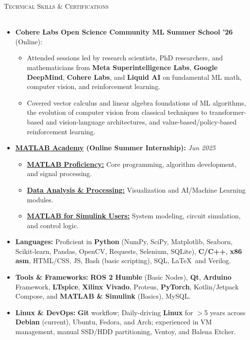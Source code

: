 \documentclass[a4paper]{article}
\newcommand{\lineunder} {
    \vspace*{-8pt} \\
    \hspace*{-18pt} \hrulefill \\
}
\newcommand{\header} [1] {
    {\hspace*{-18pt}\vspace*{6pt} \textsc{#1}}
    \vspace*{-6pt} \lineunder
}
\begin{document}
\header{Technical Skills \& Certifications}
\begin{itemize} \itemsep 1pt
    \item \textbf{Cohere Labs Open Science Community ML Summer School '26} (Online):
    \begin{itemize}
        \item Attended sessions led by research scientists, PhD researchers, and mathematicians from \textbf{Meta Superintelligence Labs}, \textbf{Google DeepMind}, \textbf{Cohere Labs}, and \textbf{Liquid AI} on fundamental ML math, computer vision, and reinforcement learning.
        \item Covered vector calculus and linear algebra foundations of ML algorithms, the evolution of computer vision from classical techniques to transformer-based and vision-language architectures, and value-based/policy-based reinforcement learning.
    \end{itemize}
    \item \textbf{\href{https://matlabacademy.mathworks.com/?page=1&sort=featured}{MATLAB Academy} (Online Summer Internship):} \hfill \textit{Jun 2025}
    \begin{itemize}
        \item \href{https://www.credly.com/badges/5c9e05db-f4b5-4435-a360-226a04411a5e}{\textbf{MATLAB Proficiency:}} Core programming, algorithm development, and signal processing.
        \item \href{https://www.credly.com/badges/47d8690a-7a2d-4248-9c41-27fc8f8edc62}{\textbf{Data Analysis \& Processing:}} Visualization and AI/Machine Learning modules.
        \item \href{https://www.credly.com/badges/f69c1b8e-5a25-423f-9eba-db02fd2b6fb2}{\textbf{MATLAB for Simulink Users:}} System modeling, circuit simulation, and control logic.
    \end{itemize}

    \item \textbf{Languages:} Proficient in \textbf{Python} (NumPy, SciPy, Matplotlib, Seaborn, Scikit-learn, Pandas, OpenCV, Requests, Selenium, SQLite), \textbf{C/C++}, \textbf{x86 asm}, HTML/CSS, JS, Bash (basic scripting), SQL, \LaTeX\, and Verilog.
    \item \textbf{Tools \& Frameworks:} \textbf{ROS 2 Humble} (Basic Nodes), \textbf{Qt}, \textbf{Arduino} Framework, \textbf{LTspice}, \textbf{Xilinx Vivado}, Proteus, \textbf{PyTorch}, Kotlin/Jetpack Compose, and \textbf{MATLAB \& Simulink} (Basics), MySQL.
    \item \textbf{Linux \& DevOps:} \textbf{Git} workflow; Daily-driving \textbf{Linux} for $>$5 years across \textbf{Debian} (current), Ubuntu, Fedora, and Arch; experienced in VM management, manual SSD/HDD partitioning, Ventoy, and Balena Etcher.
\end{itemize}
\end{document}
